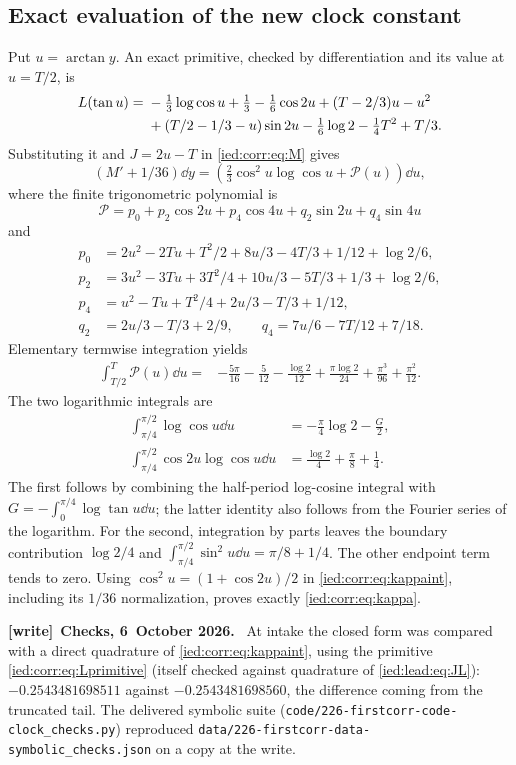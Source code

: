 \documentclass[11pt,letterpaper]{article}
\theoremstyle{remark}\newtheorem{remark}[theorem]{Remark}
\newcommand{\file}[1]{\nolinkurl{#1}}
\newenvironment{writenote}[1][]{\par\smallskip\begingroup\small
 \noindent\textbf{[write]}\if\relax\detokenize{#1}\relax\else~\textbf{#1.}\fi\ }%
 {\par\endgroup\smallskip}
\begin{document}
\subsection{Exact evaluation of the new clock constant}\label{ied:corr:sub:kappa}
Put $u=\arctan y$. An exact primitive, checked by differentiation and its value at $u=T/2$, is
\begin{align}\label{ied:corr:eq:Lprimitive}
 L(\tan u)={}&-\tfrac13\log\cos u+\tfrac13-\tfrac16\cos2u
 +(T-2/3)u-u^2\notag\\
 &+(T/2-1/3-u)\sin2u-\tfrac16\log2-\tfrac14T^2+T/3.
\end{align}
Substituting it and $J=2u-T$ in \eqref{ied:corr:eq:M} gives
\[
 (M'+1/36)\dd y=\left(\tfrac23\cos^2u\log\cos u+\mathcal P(u)\right)\dd u,
\]
where the finite trigonometric polynomial is
\[
 \mathcal P=p_0+p_2\cos2u+p_4\cos4u+q_2\sin2u+q_4\sin4u
\]
and
\begin{align*}
 p_0&=2u^2-2Tu+T^2/2+8u/3-4T/3+1/12+\log2/6,\\
 p_2&=3u^2-3Tu+3T^2/4+10u/3-5T/3+1/3+\log2/6,\\
 p_4&=u^2-Tu+T^2/4+2u/3-T/3+1/12,\\
 q_2&=2u/3-T/3+2/9,\qquad q_4=7u/6-7T/12+7/18.
\end{align*}
Elementary termwise integration yields
\begin{align*}
 \int_{T/2}^T\mathcal P(u)\dd u={}&-\frac{5\pi}{16}-\frac5{12}-\frac{\log2}{12}
 +\frac{\pi\log2}{24}+\frac{\pi^3}{96}+\frac{\pi^2}{12}.
\end{align*}
The two logarithmic integrals are
\begin{align*}
 \int_{\pi/4}^{\pi/2}\log\cos u\dd u&=-\frac\pi4\log2-\frac G2,\\
 \int_{\pi/4}^{\pi/2}\cos2u\log\cos u\dd u&=\frac{\log2}{4}+\frac\pi8+\frac14.
\end{align*}
The first follows by combining the half-period log-cosine integral with
$G=-\int_0^{\pi/4}\log\tan u\dd u$; the latter identity also follows from the Fourier series of the logarithm. For the second, integration by parts leaves the boundary contribution $\log2/4$ and $\int_{\pi/4}^{\pi/2}\sin^2u\dd u=\pi/8+1/4$. The other endpoint term tends to zero. Using $\cos^2u=(1+\cos2u)/2$ in \eqref{ied:corr:eq:kappaint}, including its $1/36$ normalization, proves exactly \eqref{ied:corr:eq:kappa}.

\begin{writenote}[Checks, 6~October 2026]
At intake the closed form was compared with a direct quadrature of \eqref{ied:corr:eq:kappaint}, using the primitive \eqref{ied:corr:eq:Lprimitive} (itself checked against quadrature of \eqref{ied:lead:eq:JL}): $-0.2543481698511$ against $-0.2543481698560$, the difference coming from the truncated tail. The delivered symbolic suite (\file{code/226-firstcorr-code-clock_checks.py}) reproduced \file{data/226-firstcorr-data-symbolic_checks.json} on a copy at the write.
\end{writenote}
\end{document}
